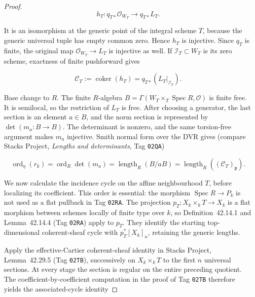 \begin{proof}
\[
 h_T:q_{T*}\mathcal O_{W_T}\longrightarrow q_{T*}L_T.
\]

It is an isomorphism at the generic point of the integral scheme \(T\),
because the generic universal tuple has empty common zero.  Hence
\(h_T\) is injective.  Since \(q_T\) is finite, the original map
\(\mathcal O_{W_T}\to L_T\) is injective as well.  If
\(\mathcal I_T\subset W_T\) is its zero scheme, exactness of finite
pushforward gives

\begin{equation}
 \mathcal C_T:=\operatorname{coker}(h_T)
 =q_{T*}(L_T|_{\mathcal I_T}).
 \label{eq:p171-revised2-cokernel-sheaf}
\end{equation}

Base change to \(R\).  The finite \(R\)-algebra
\(B=\Gamma(W_T\times_T\operatorname{Spec}R,\mathcal O)\) is finite free.
It is semilocal, so the restriction of \(L_T\) is free.  After choosing a
generator, the last section is an element \(a\in B\), and the norm section
is represented by \(\det(m_a:B\to B)\).  The determinant is nonzero, and
the same torsion-free argument makes \(m_a\) injective.  Smith normal form
over the DVR gives (compare Stacks Project, \emph{Lengths and
determinants}, Tag \texttt{02QA})

\begin{equation}
 \operatorname{ord}_\eta(r_k)
 =\operatorname{ord}_R\det(m_a)
 =\operatorname{length}_R(B/aB)
 =\operatorname{length}_R((\mathcal C_T)_\mathfrak p).
 \label{eq:p171-revised2-dvr-length}
\end{equation}

We now calculate the incidence cycle on the affine neighbourhood \(T\),
before localizing its coefficient.  This order is essential: the morphism
\(\operatorname{Spec}R\to P_k\) is not used as a flat pullback in
Tag \texttt{02RA}.  The projection
\(p_T:X_k\times_kT\to X_k\) is a flat morphism between schemes locally of
finite type over \(k\), so Definition~42.14.1 and Lemma~42.14.4
(Tag \texttt{02RA}) apply to \(p_T\).  They identify the starting
top-dimensional coherent-sheaf cycle with
\(p_T^*[X_k]_n\), retaining the generic lengths.

Apply the effective-Cartier coherent-sheaf identity in Stacks Project,
Lemma~42.29.5 (Tag \texttt{02TB}), successively on
\(X_k\times_kT\) to the first \(n\) universal sections.  At every stage
the section is regular on the entire preceding quotient.  The
coefficient-by-coefficient computation in the proof of Tag \texttt{02TB}
therefore yields the associated-cycle identity


\end{proof}
